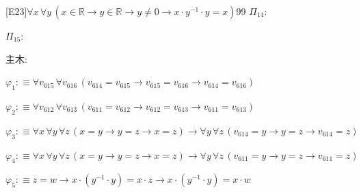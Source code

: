 \begin{fullproof}{[E23]}{$\forall x\,\forall y\,(x \in \mathbb{R} \to y \in \mathbb{R} \to y \neq 0 \to x \cdot y^{-1} \cdot y = x)$}{99}
\noindent$\Pi_{14}$:
\begin{ptree}
\noLine
{}
\noLine
{}
\end{ptree}
\noindent$\Pi_{15}$:
\begin{ptree}
\noLine
{}
\noLine
{}
\end{ptree}
\noindent 主木:
\begin{ptree}
\noLine
{}
\noLine
{}
\end{ptree}
\begin{abbrevlist}
\item $\varphi_{1} :\equiv \forall v_{615}\,\forall v_{616}\,(v_{614} = v_{615} \to v_{615} = v_{616} \to v_{614} = v_{616})$
\item $\varphi_{2} :\equiv \forall v_{612}\,\forall v_{613}\,(v_{611} = v_{612} \to v_{612} = v_{613} \to v_{611} = v_{613})$
\item $\varphi_{3} :\equiv \forall x\,\forall y\,\forall z\,(x = y \to y = z \to x = z) \to \forall y\,\forall z\,(v_{614} = y \to y = z \to v_{614} = z)$
\item $\varphi_{4} :\equiv \forall x\,\forall y\,\forall z\,(x = y \to y = z \to x = z) \to \forall y\,\forall z\,(v_{611} = y \to y = z \to v_{611} = z)$
\item $\varphi_{5} :\equiv z = w \to x \cdot (y^{-1} \cdot y) = x \cdot z \to x \cdot (y^{-1} \cdot y) = x \cdot w$

\end{abbrevlist}
\end{fullproof}
